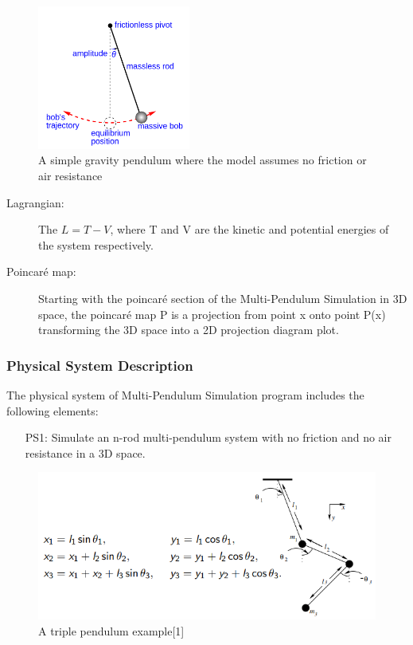 \documentclass[12pt]{article}
\newcommand{\progname}{Multi-Pendulum Simulation }
\begin{document}
\begin{figure}[H]
	\centering
	\includegraphics[width=190px]{simple-pend.png}
\caption{A simple gravity pendulum where the model assumes no friction or air
resistance}
	\label{fig:maxresdefault}
\end{figure}

\begin{description}
\item[Lagrangian:] The $L=T-V$, where T and V are the kinetic and potential
energies of the system respectively.
\item[Poincaré map:] Starting with the poincaré section of the \progname in 3D space, the poincaré map P
is a projection from point x onto point P(x) transforming the 3D space into a 2D projection diagram plot.
\end{description}

\subsubsection{Physical System Description}

The physical system of \progname program includes the following elements:

\begin{itemize}
\item[PS1:] Simulate an n-rod multi-pendulum system with no friction and no air
resistance in a 3D space.
\end{itemize}

\begin{figure}[H]
	\centering
	\includegraphics[width=450px]{triplependula.PNG}
\caption{A triple pendulum example[1]}
	\label{fig:maxresdefault}
\end{figure}
\end{document}
